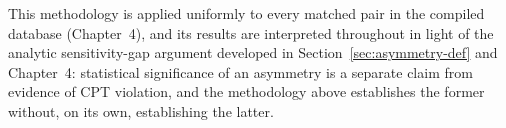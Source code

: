 This methodology is applied uniformly to every matched pair in the
compiled database (Chapter~4), and its results are interpreted throughout
in light of the analytic sensitivity-gap argument developed in
Section~\ref{sec:asymmetry-def} and Chapter~4: statistical significance of
an asymmetry is a separate claim from evidence of CPT violation, and the
methodology above establishes the former without, on its own, establishing
the latter.
